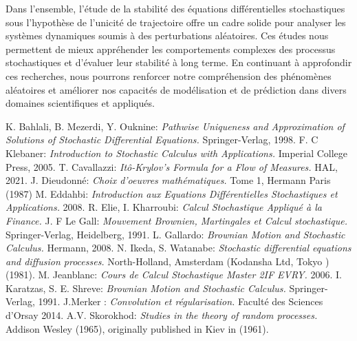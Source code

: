 \documentclass[A4paper,12pt]{report}
\begin{document}
Dans l'ensemble, l'étude de la stabilité des équations différentielles stochastiques sous l'hypothèse de l'unicité de trajectoire offre un cadre solide pour analyser les systèmes dynamiques soumis à des perturbations aléatoires. Ces études nous permettent de mieux appréhender les comportements complexes des processus stochastiques et d'évaluer leur stabilité à long terme. En continuant à approfondir ces recherches, nous pourrons renforcer notre compréhension des phénomènes aléatoires et améliorer nos capacités de modélisation et de prédiction dans divers domaines scientifiques et appliqués.
\begin{thebibliography}{99}
		  K. Bahlali, B. Mezerdi, Y. Ouknine: \textit{Pathwise Uniqueness and Approximation of Solutions of Stochastic Differential Equations.  } Springer-Verlag, 1998.\label{Ouknine}
		  F. C Klebaner: \textit{Introduction to Stochastic Calculus with Applications.} Imperial College Press, 2005.  \label{Klebaner}
		  T. Cavallazzi: \textit{Itô-Krylov’s Formula for a Flow of Measures.} HAL, 2021.\label{Cavallazzi}
		  J. Dieudonné: \textit{Choix d’oeuvres mathématiques.}  Tome 1, Hermann Paris
(1987)\label{Dieudonné} 
		 M. Eddahbi: \textit{Introduction aux Equations Différentielles Stochastiques et Applications. } 2008.\label{Eddahbi}
		 R. Elie, I. Kharroubi: \textit{Calcul Stochastique Appliqué à la Finance.}  \label{KHARROUBI}
	J. F Le Gall: \textit{Mouvement Brownien, Martingales et Calcul stochastique.}  Springer-Verlag,  Heidelberg, 1991.\label{Le Gall}
	L. Gallardo: \textit{Brownian Motion and Stochastic Calculus.} Hermann, 2008. \label{Gallardo}
	  N. Ikeda, S. Watanabe: \textit{Stochastic differential equations and diffusion processes.}  North-Holland, Amsterdam (Kodansha Ltd, Tokyo ) (1981).\label{Ikeda} 
	M. Jeanblanc: \textit{Cours de Calcul Stochastique Master 2IF EVRY.} 2006.  \label{Jeanblanc}
	 I. Karatzas, S. E. Shreve: \textit{Brownian Motion and Stochastic Calculus.} Springer-Verlag, 1991.\label{Karatzas}	  
           J.Merker : \textit{ Convolution et régularisation.} Faculté des Sciences d'Orsay 2014.
          \label{MERKER}
       A.V. Skorokhod: \textit{ Studies in the theory of random processes.} Addison Wesley (1965), originally published in Kiev in (1961).\label{Skoro}
\end{thebibliography}
 
\end{document}
